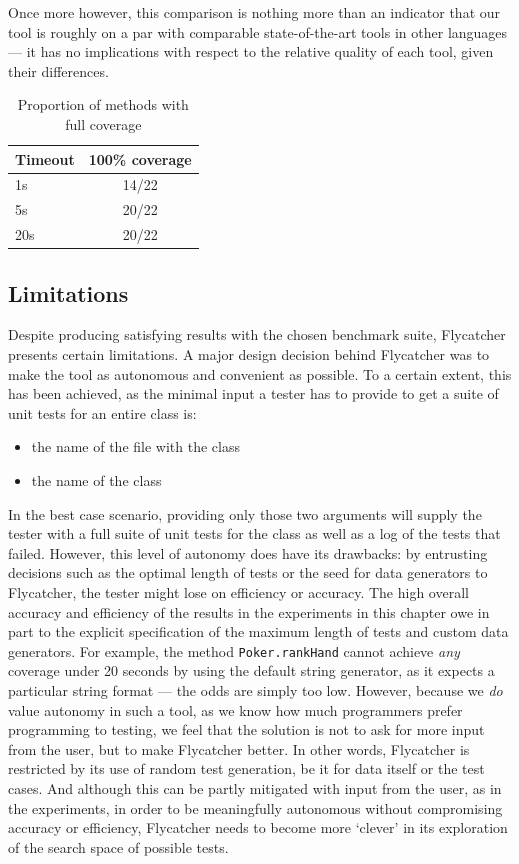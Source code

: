 Once more however, this comparison is nothing more than an indicator that our tool is roughly on a par with comparable state-of-the-art tools in other languages --- it has no implications with respect to the relative quality of each tool, given their differences.

\begin{table}[b]
\centering
\begin{tabular}{lc}
\toprule
\textbf{Timeout} & \textbf{100\% coverage} \\
\toprule
1s & 14/22 \\
5s & 20/22 \\
20s & 20/22 \\
\bottomrule
\end{tabular}
\caption{Proportion of methods with full coverage}
\label{covresults}
\end{table}


\subsection{Limitations}
Despite producing satisfying results with the chosen benchmark suite, \textsf{Flycatcher} presents certain limitations. A major design decision behind \textsf{Flycatcher} was to make the tool as autonomous and convenient as possible. To a certain extent, this has been achieved, as the minimal input a tester has to provide to get a suite of unit tests for an entire class is:

\begin{itemize}
   \item the name of the file with the class
   \item the name of the class
\end{itemize}

In the best case scenario, providing only those two arguments will supply the tester with a full suite of unit tests for the class as well as a log of the tests that failed. However, this level of autonomy does have its drawbacks: by entrusting decisions such as the optimal length of tests or the seed for data generators to \textsf{Flycatcher}, the tester might lose on efficiency or accuracy. The high overall accuracy and efficiency of the results in the experiments in this chapter owe in part to the explicit specification of the maximum length of tests and custom data generators. For example, the method \texttt{Poker.rankHand} cannot achieve \emph{any} coverage under 20 seconds by using the default string generator, as it expects a particular string format --- the odds are simply too low. However, because we \emph{do} value autonomy in such a tool, as we know how much programmers prefer programming to testing, we feel that the solution is not to ask for more input from the user, but to make \textsf{Flycatcher} better. In other words, \textsf{Flycatcher} is restricted by its use of random test generation, be it for data itself or the test cases. And although this can be partly mitigated with input from the user, as in the experiments, in order to be meaningfully autonomous without compromising accuracy or efficiency, \textsf{Flycatcher} needs to become more `clever' in its exploration of the search space of possible tests.\\


